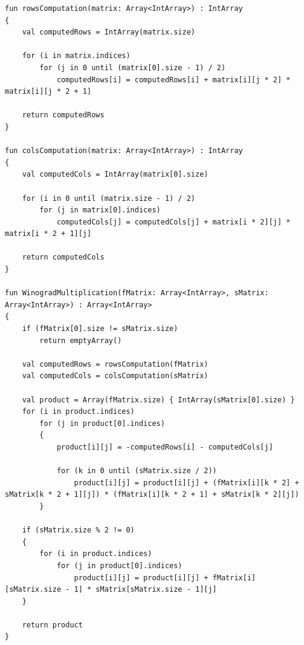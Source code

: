 \documentclass[12pt]{report}
\begin{document}
\begin{lstlisting}[caption=Функция реализации алгоритма Копперсмита-Винограда,
label={Winograd}]
fun rowsComputation(matrix: Array<IntArray>) : IntArray
{
    val computedRows = IntArray(matrix.size)

    for (i in matrix.indices)
        for (j in 0 until (matrix[0].size - 1) / 2)
            computedRows[i] = computedRows[i] + matrix[i][j * 2] * matrix[i][j * 2 + 1]

    return computedRows
}

fun colsComputation(matrix: Array<IntArray>) : IntArray
{
    val computedCols = IntArray(matrix[0].size)

    for (i in 0 until (matrix.size - 1) / 2)
        for (j in matrix[0].indices)
            computedCols[j] = computedCols[j] + matrix[i * 2][j] * matrix[i * 2 + 1][j]

    return computedCols
}

fun WinogradMultiplication(fMatrix: Array<IntArray>, sMatrix: Array<IntArray>) : Array<IntArray>
{
    if (fMatrix[0].size != sMatrix.size)
        return emptyArray()

    val computedRows = rowsComputation(fMatrix)
    val computedCols = colsComputation(sMatrix)

    val product = Array(fMatrix.size) { IntArray(sMatrix[0].size) }
    for (i in product.indices)
        for (j in product[0].indices)
        {
            product[i][j] = -computedRows[i] - computedCols[j]

            for (k in 0 until (sMatrix.size / 2))
                product[i][j] = product[i][j] + (fMatrix[i][k * 2] + sMatrix[k * 2 + 1][j]) * (fMatrix[i][k * 2 + 1] + sMatrix[k * 2][j])
        }

    if (sMatrix.size % 2 != 0)
    {
        for (i in product.indices)
            for (j in product[0].indices)
                product[i][j] = product[i][j] + fMatrix[i][sMatrix.size - 1] * sMatrix[sMatrix.size - 1][j]
    }

    return product
}
\end{lstlisting}
\end{document}
